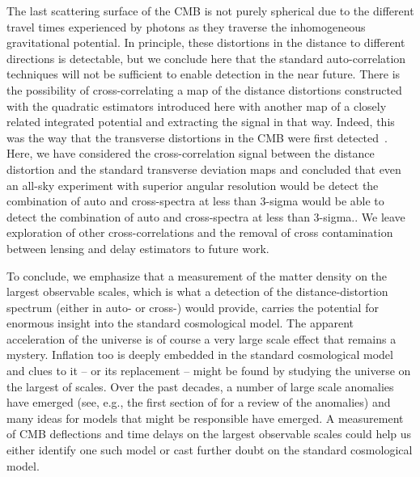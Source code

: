 \documentclass[prd,amsmath,amssymb,floatfix,superscriptaddress,nofootinbib,twocolumn]{revtex4-1}
\newcommand{\peikai}[1]{{\color{blue} #1}}
\newcommand{\prvs}[1]{{\color{magenta} #1}}
\begin{document}
The last scattering surface of the CMB is not purely spherical due to the different travel times experienced by photons as they traverse the inhomogeneous gravitational potential. In principle, these distortions in the distance to different directions is detectable, but we conclude here that the standard auto-correlation techniques will not be sufficient to enable detection in the near future. There is the possibility of cross-correlating a map of the distance distortions constructed with the quadratic estimators introduced here with another map of a closely related integrated potential and extracting the signal in that way. Indeed, this was the way that the transverse distortions in the CMB were first detected~\cite{Smith:2007rg}. Here, we have considered  the cross-correlation signal between the distance distortion and the standard transverse deviation maps and concluded that even an all-sky experiment with superior angular resolution \prvs{would be detect the combination of auto and cross-spectra at less than 3-sigma} \peikai{would be able to detect the combination of auto and cross-spectra at less than 3-sigma.}. We leave exploration of other cross-correlations and the removal of cross contamination between lensing and delay estimators to future work.

To conclude, we emphasize that a measurement of the matter density on the largest observable scales, which is what a detection of the distance-distortion spectrum (either in auto- or cross-) would provide, carries the potential for enormous insight into the standard cosmological model. The apparent acceleration of the universe is of course a very large scale effect that remains a mystery. Inflation too is deeply embedded in the standard cosmological model and clues to it -- or its replacement -- might be found by studying the universe on the largest of scales. Over the past decades, a number of large scale anomalies have emerged (see, e.g., the first section of \citet{Hansen:2018pgg} for a review of the anomalies) and many ideas for models that might be responsible have emerged. A measurement of CMB deflections and time delays on the largest observable scales could help us either identify one such model or cast further doubt on the standard cosmological model.
\end{document}
